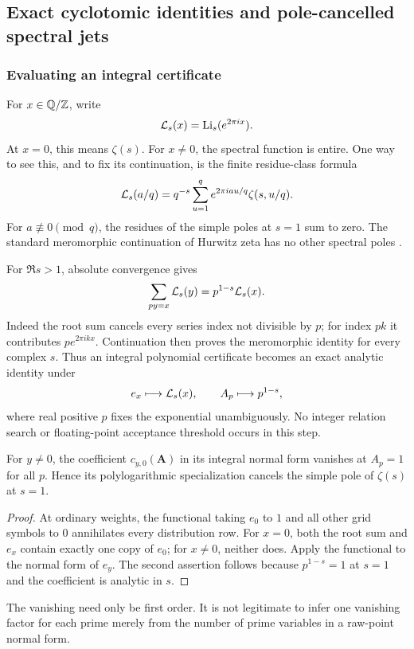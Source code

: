 \subsection{Exact cyclotomic identities and pole-cancelled spectral jets}
\label{ir:sec:identities}

\subsubsection{Evaluating an integral certificate}
For $x\in\mathbb{Q}/\mathbb{Z}$, write
\[
 \mathcal L_{s}(x)=\operatorname{Li}_s(e^{2\pi i x}).
\]
At $x=0$, this means $\zeta(s)$. For $x\ne0$, the spectral function
is entire. One way to see this, and to fix its continuation, is the
finite residue-class formula
\begin{equation}\label{ir:eq:fourier-hurwitz}
 \mathcal L_{s}(a/q)=q^{-s}\sum_{u=1}^{q}e^{2\pi i au/q}\zeta(s,u/q).
\end{equation}
For $a\not\equiv0\pmod q$, the residues of the simple poles at
$s=1$ sum to zero. The standard meromorphic continuation of Hurwitz
zeta has no other spectral poles \cite{intdist:DLMFHurwitz}.

For $\Re s>1$, absolute convergence gives
\begin{equation}\label{ir:eq:analytic-distribution}
 \sum_{py=x}\mathcal L_{s}(y)=p^{1-s}\mathcal L_{s}(x).
\end{equation}
Indeed the root sum cancels every series index not divisible by $p$;
for index $pk$ it contributes $p e^{2\pi i kx}$.
Continuation then proves the meromorphic identity for every complex
$s$. Thus an integral polynomial certificate becomes an exact analytic
identity under
\begin{equation}\label{ir:eq:polylog-weights}
 e_x\longmapsto\mathcal L_{s}(x),\qquad A_p\longmapsto p^{1-s},
\end{equation}
where real positive $p$ fixes the exponential unambiguously. No integer
relation search or floating-point acceptance threshold occurs in this
step.

\begin{proposition}
\label{ir:prop:endpoint-zero}
For $y\ne0$, the coefficient $c_{y,0}(\mathbf A)$ in its integral
normal form vanishes at $A_p=1$ for all $p$. Hence its polylogarithmic
specialization cancels the simple pole of $\zeta(s)$ at $s=1$.
\end{proposition}
\begin{proof}
At ordinary weights, the functional taking $e_0$ to $1$ and all
other grid symbols to $0$ annihilates every distribution row. For
$x=0$, both the root sum and $e_x$ contain exactly one copy of
$e_0$; for $x\ne0$, neither does. Apply the functional to the
normal form of $e_y$. The second assertion follows because
$p^{1-s}=1$ at $s=1$ and the coefficient is analytic in $s$.
\end{proof}
The vanishing need only be first order. It is not legitimate to infer
one vanishing factor for each prime merely from the number of prime
variables in a raw-point normal form.

